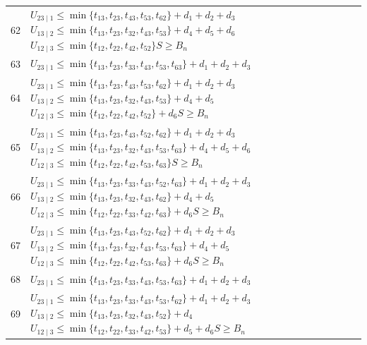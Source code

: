 \documentclass[a4paper,11pt]{amsart}
\numberwithin{equation}{section}
\theoremstyle{definition}
\theoremstyle{remark}
\begin{document}
{\begin{longtable}{@{}r>{\raggedright\arraybackslash}p{12.9cm}@{}}
62 & \(U_{23\mid 1}\leq \min\{t_{13},t_{23},t_{43},t_{53},t_{62}\}+d_{1}+d_{2}+d_{3}\)\newline \(U_{13\mid 2}\leq \min\{t_{13},t_{23},t_{32},t_{43},t_{53}\}+d_{4}+d_{5}+d_{6}\)\newline \(U_{12\mid 3}\leq \min\{t_{12},t_{22},t_{42},t_{52}\}\)\newline \(S\geq B_n\)\\[3pt]
63 & \(U_{23\mid 1}\leq \min\{t_{13},t_{23},t_{33},t_{43},t_{53},t_{63}\}+d_{1}+d_{2}+d_{3}\)\\[3pt]
64 & \(U_{23\mid 1}\leq \min\{t_{13},t_{23},t_{43},t_{53},t_{62}\}+d_{1}+d_{2}+d_{3}\)\newline \(U_{13\mid 2}\leq \min\{t_{13},t_{23},t_{32},t_{43},t_{53}\}+d_{4}+d_{5}\)\newline \(U_{12\mid 3}\leq \min\{t_{12},t_{22},t_{42},t_{52}\}+d_{6}\)\newline \(S\geq B_n\)\\[3pt]
65 & \(U_{23\mid 1}\leq \min\{t_{13},t_{23},t_{43},t_{52},t_{62}\}+d_{1}+d_{2}+d_{3}\)\newline \(U_{13\mid 2}\leq \min\{t_{13},t_{23},t_{32},t_{43},t_{53},t_{63}\}+d_{4}+d_{5}+d_{6}\)\newline \(U_{12\mid 3}\leq \min\{t_{12},t_{22},t_{42},t_{53},t_{63}\}\)\newline \(S\geq B_n\)\\[3pt]
66 & \(U_{23\mid 1}\leq \min\{t_{13},t_{23},t_{33},t_{43},t_{52},t_{63}\}+d_{1}+d_{2}+d_{3}\)\newline \(U_{13\mid 2}\leq \min\{t_{13},t_{23},t_{32},t_{43},t_{62}\}+d_{4}+d_{5}\)\newline \(U_{12\mid 3}\leq \min\{t_{12},t_{22},t_{33},t_{42},t_{63}\}+d_{6}\)\newline \(S\geq B_n\)\\[3pt]
67 & \(U_{23\mid 1}\leq \min\{t_{13},t_{23},t_{43},t_{52},t_{62}\}+d_{1}+d_{2}+d_{3}\)\newline \(U_{13\mid 2}\leq \min\{t_{13},t_{23},t_{32},t_{43},t_{53},t_{63}\}+d_{4}+d_{5}\)\newline \(U_{12\mid 3}\leq \min\{t_{12},t_{22},t_{42},t_{53},t_{63}\}+d_{6}\)\newline \(S\geq B_n\)\\[3pt]
68 & \(U_{23\mid 1}\leq \min\{t_{13},t_{23},t_{33},t_{43},t_{53},t_{63}\}+d_{1}+d_{2}+d_{3}\)\\[3pt]
69 & \(U_{23\mid 1}\leq \min\{t_{13},t_{23},t_{33},t_{43},t_{53},t_{62}\}+d_{1}+d_{2}+d_{3}\)\newline \(U_{13\mid 2}\leq \min\{t_{13},t_{23},t_{32},t_{43},t_{52}\}+d_{4}\)\newline \(U_{12\mid 3}\leq \min\{t_{12},t_{22},t_{33},t_{42},t_{53}\}+d_{5}+d_{6}\)\newline \(S\geq B_n\)\\[3pt]

\end{longtable}}
\end{document}
